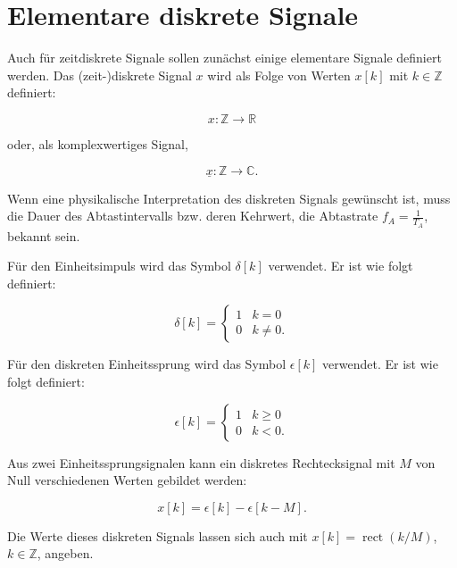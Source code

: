\section{Elementare diskrete Signale}
\label{sec:elementare-diskrete-signale}

Auch für zeitdiskrete Signale sollen zunächst einige elementare Signale definiert werden. Das (zeit-)diskrete Signal $x$ wird als Folge von Werten $x[k]$ mit $k \in \mathbb{Z}$ definiert:

$$
x:\mathbb{Z} \rightarrow \mathbb{R}
$$

oder, als komplexwertiges Signal,

$$
\underline{x}:\mathbb{Z} \rightarrow \mathbb{C}.
$$

Wenn eine physikalische Interpretation des diskreten Signals gewünscht ist, muss die Dauer des Abtastintervalls bzw. deren Kehrwert, die Abtastrate $f_A = \frac{1}{T_A}$, bekannt sein.

\begin{definition}
Für den Einheitsimpuls wird das Symbol $\delta[k]$ verwendet. Er ist wie folgt definiert:

$$
\delta[k] = \begin{cases} 1 & k = 0 \\ 0 & k \neq 0. \end{cases}
$$

\end{definition}

\begin{definition}
Für den diskreten Einheitssprung wird das Symbol $\epsilon[k]$ verwendet. Er ist wie folgt definiert:

$$
\epsilon[k] = \begin{cases} 1 & k \geq 0 \\ 0 & k < 0. \end{cases}
$$

\end{definition}

\begin{definition}
Aus zwei Einheitssprungsignalen kann ein diskretes Rechtecksignal mit $M$ von Null verschiedenen Werten gebildet werden:

$$
x[k] = \epsilon[k] - \epsilon[k - M].
$$

Die Werte dieses diskreten Signals lassen sich auch mit $x[k] = \operatorname{rect}(k/M)$, $k \in \mathbb{Z}$, angeben.

\end{definition}

